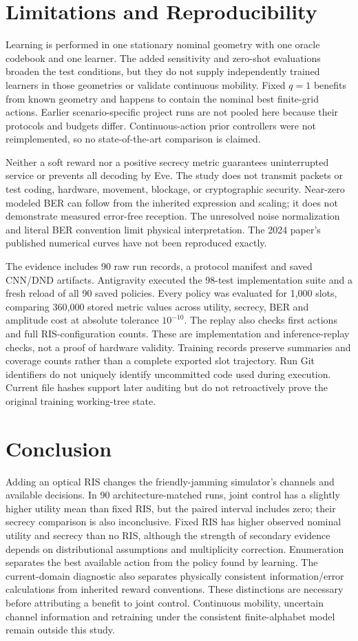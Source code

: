 \documentclass[journal,10pt,twocolumn]{IEEEtran}
\begin{document}
\section{Limitations and Reproducibility}
Learning is performed in one stationary nominal geometry with one oracle codebook and one learner. The added sensitivity and zero-shot evaluations broaden the test conditions, but they do not supply independently trained learners in those geometries or validate continuous mobility. Fixed $q=1$ benefits from known geometry and happens to contain the nominal best finite-grid actions. Earlier scenario-specific project runs are not pooled here because their protocols and budgets differ. Continuous-action prior controllers were not reimplemented, so no state-of-the-art comparison is claimed.

Neither a soft reward nor a positive secrecy metric guarantees uninterrupted service or prevents all decoding by Eve. The study does not transmit packets or test coding, hardware, movement, blockage, or cryptographic security. Near-zero modeled BER can follow from the inherited expression and scaling; it does not demonstrate measured error-free reception. The unresolved noise normalization and literal BER convention limit physical interpretation. The 2024 paper's published numerical curves have not been reproduced exactly.

The evidence includes 90 raw run records, a protocol manifest and saved CNN/DND artifacts. Antigravity executed the 98-test implementation suite and a fresh reload of all 90 saved policies. Every policy was evaluated for 1,000 slots, comparing 360,000 stored metric values across utility, secrecy, BER and amplitude cost at absolute tolerance $10^{-10}$. The replay also checks first actions and full RIS-configuration counts. These are implementation and inference-replay checks, not a proof of hardware validity. Training records preserve summaries and coverage counts rather than a complete exported slot trajectory. Run Git identifiers do not uniquely identify uncommitted code used during execution. Current file hashes support later auditing but do not retroactively prove the original training working-tree state.

\section{Conclusion}
Adding an optical RIS changes the friendly-jamming simulator's channels and available decisions. In 90 architecture-matched runs, joint control has a slightly higher utility mean than fixed RIS, but the paired interval includes zero; their secrecy comparison is also inconclusive. Fixed RIS has higher observed nominal utility and secrecy than no RIS, although the strength of secondary evidence depends on distributional assumptions and multiplicity correction. Enumeration separates the best available action from the policy found by learning. The current-domain diagnostic also separates physically consistent information/error calculations from inherited reward conventions. These distinctions are necessary before attributing a benefit to joint control. Continuous mobility, uncertain channel information and retraining under the consistent finite-alphabet model remain outside this study.
\end{document}
